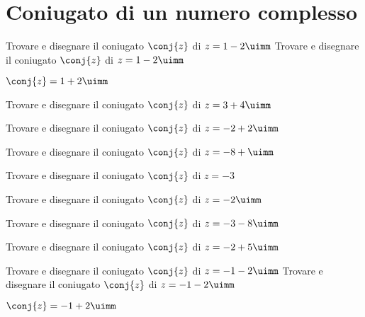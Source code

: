  \section{Coniugato di un numero complesso}
\begin{exercise}
	Trovare e disegnare il coniugato $\conj{z}$ di $z=1-2\uimm$
	\tcblower
	Trovare e disegnare il coniugato $\conj{z}$ di $z=1-2\uimm$
	
	$\conj{z}=1+2\uimm$
	\begin{center}
		
		\label{fig:disegnopianocomplesso05}
	\end{center}
\end{exercise}
\begin{exercise}[no solution]
	Trovare e disegnare il coniugato $\conj{z}$ di $z=3+4\uimm$
\end{exercise}
\begin{exercise}[no solution]
	Trovare e disegnare il coniugato $\conj{z}$ di $z=-2+2\uimm$
\end{exercise}
\begin{exercise}[no solution]
	Trovare e disegnare il coniugato $\conj{z}$ di $z=-8+\uimm$
\end{exercise}
\begin{exercise}[no solution]
	Trovare e disegnare il coniugato $\conj{z}$ di $z=-3$
\end{exercise}
\begin{exercise}[no solution]
	Trovare e disegnare il coniugato $\conj{z}$ di $z=-2\uimm$
\end{exercise}
\begin{exercise}[no solution]
	Trovare e disegnare il coniugato $\conj{z}$ di $z=-3-8\uimm$
\end{exercise}
\begin{exercise}[no solution]
	Trovare e disegnare il coniugato $\conj{z}$ di $z=-2+5\uimm$
\end{exercise}
\begin{exercise}
	Trovare e disegnare il coniugato $\conj{z}$ di  $z=-1-2\uimm$
	\tcblower
	Trovare e disegnare il coniugato $\conj{z}$ di  $z=-1-2\uimm$
	
	$\conj{z}=-1+2\uimm$
	\begin{center}
		
		\label{fig:disegnopianocomplesso15}
	\end{center}
\end{exercise}
